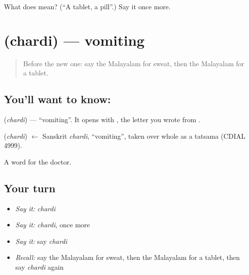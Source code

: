 \begin{tcolorbox}[breakable,colback=teal!4,colframe=teal!35!black,title={Before you move on}]
What does  mean? (\textquotedblleft{}A tablet, a pill\textquotedblright{}.) Say it once more.
\end{tcolorbox}
\section[\texorpdfstring{\ml{ഛർദ്ദി} (chardi)}{ഛർദ്ദി (chardi)}]{ (chardi) — vomiting}

\label{lesson:ML-C117-vomiting}



\begin{quote}
Before the new one: say the Malayalam for sweat, then the Malayalam for a tablet.
\end{quote}

\subsection*{You'll want to know: }
\textbf{} (\emph{chardi}) — \textquotedblleft{}vomiting\textquotedblright{}. It opens with \textbf{}, the letter you wrote from \textbf{}.

\begin{cousinweb}
\textbf{} (\emph{chardi}) $\leftarrow$ Sanskrit \emph{chardi}, \textquotedblleft{}vomiting\textquotedblright{}, taken over whole as a tatsama (CDIAL 4999).
\end{cousinweb}

\begin{grammarlens}[title={What you've built}]
A word for the doctor.
\end{grammarlens}

\subsection*{Your turn}
\begin{itemize}
\raggedright
  \item \emph{Say it:} \emph{chardi}
  \item \emph{Say it:} \emph{chardi}, once more
  \item \emph{Say it:} say \emph{chardi}
  \item \emph{Recall:} say the Malayalam for sweat, then the Malayalam for a tablet, then say \emph{chardi} again
\end{itemize}

